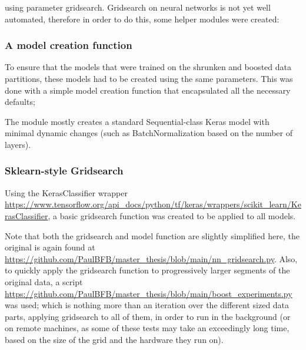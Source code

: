 using parameter gridsearch. Gridsearch on neural networks is not yet well automated, therefore in order to do this, some helper modules were created:

\clearpage

\subsubsection{A model creation function}

To ensure that the models that were trained on the shrunken and boosted data partitions, these models had to be created using the same parameters.
This was done with a simple model creation function that encapsulated all the necessary defaults;



The module mostly creates a standard Sequential-class Keras model with minimal dynamic changes (such as BatchNormalization based on the number of layers).

\clearpage

\subsubsection{Sklearn-style Gridsearch} 

Using the KerasClassifier wrapper \url{https://www.tensorflow.org/api_docs/python/tf/keras/wrappers/scikit_learn/KerasClassifier}, a basic gridsearch function was created to be applied to all models.



Note that both the gridsearch and model function are slightly simplified here, the original is again found at \url{https://github.com/PaulBFB/master_thesis/blob/main/nn_gridsearch.py}. 
Also, to quickly apply the gridsearch function to progressively larger segments of the original data, a script \url{https://github.com/PaulBFB/master_thesis/blob/main/boost_experiments.py} was used; 
which is nothing more than an iteration over the different sized data parts, applying gridsearch to all of them, in order to run in the background (or on remote machines, as some of these tests may take an exceedingly long time, based on the size of the grid and the hardware they run on).

\clearpage

